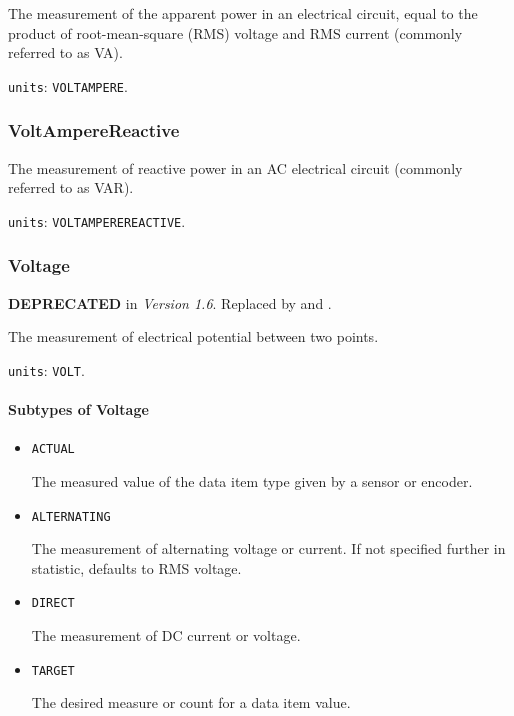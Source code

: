 The measurement of the apparent power in an electrical circuit, equal to the product of root-mean-square (RMS) voltage and RMS current (commonly referred to as VA).


\texttt{units}: \texttt{VOLT\textunderscore AMPERE}.


\subsubsection{VoltAmpereReactive}
\label{sec:VoltAmpereReactive}



The measurement of reactive power in an AC electrical circuit (commonly referred to as VAR).


\texttt{units}: \texttt{VOLT\textunderscore AMPERE\textunderscore REACTIVE}.


\subsubsection{Voltage}
\label{sec:Voltage}



\textbf{DEPRECATED} in \textit{Version 1.6}. Replaced by  and .

The measurement of electrical potential between two points.


\texttt{units}: \texttt{VOLT}.

\paragraph{Subtypes of Voltage}\mbox{}
\label{sec:Subtypes of Voltage}

\begin{itemize}

\item \texttt{ACTUAL}


The measured value of the data item type given by a sensor or encoder.

\item \texttt{ALTERNATING}


The measurement of alternating voltage or current.   If not specified further in statistic, defaults to RMS voltage. 

\item \texttt{DIRECT}


The measurement of DC current or voltage.

\item \texttt{TARGET}


The desired measure or count for a data item value.


\end{itemize}







